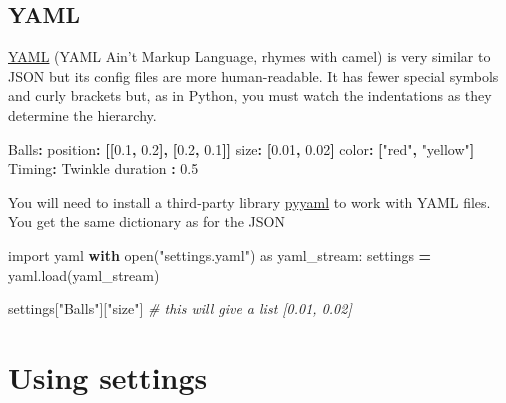\documentclass[
]{book}
\newenvironment{Shaded}{\begin{snugshade}}{\end{snugshade}}
\newcommand{\AttributeTok}[1]{\textcolor[rgb]{0.77,0.63,0.00}{#1}}
\newcommand{\BuiltInTok}[1]{#1}
\newcommand{\CommentTok}[1]{\textcolor[rgb]{0.56,0.35,0.01}{\textit{#1}}}
\newcommand{\ControlFlowTok}[1]{\textcolor[rgb]{0.13,0.29,0.53}{\textbf{#1}}}
\newcommand{\FloatTok}[1]{\textcolor[rgb]{0.00,0.00,0.81}{#1}}
\newcommand{\FunctionTok}[1]{\textcolor[rgb]{0.00,0.00,0.00}{#1}}
\newcommand{\ImportTok}[1]{#1}
\newcommand{\KeywordTok}[1]{\textcolor[rgb]{0.13,0.29,0.53}{\textbf{#1}}}
\newcommand{\NormalTok}[1]{#1}
\newcommand{\OperatorTok}[1]{\textcolor[rgb]{0.81,0.36,0.00}{\textbf{#1}}}
\newcommand{\StringTok}[1]{\textcolor[rgb]{0.31,0.60,0.02}{#1}}
\begin{document}
\hypertarget{yaml}{%
\subsection{YAML}\label{yaml}}

\href{https://en.wikipedia.org/wiki/YAML}{YAML} (YAML Ain't Markup Language, rhymes with camel) is very similar to JSON but its config files are more human-readable. It has fewer special symbols and curly brackets but, as in Python, you must watch the indentations as they determine the hierarchy.

\begin{Shaded}
\begin{Highlighting}[]
\FunctionTok{Balls}\KeywordTok{:}
\AttributeTok{  }\FunctionTok{position}\KeywordTok{:}\AttributeTok{ }\KeywordTok{[[}\FloatTok{0.1}\KeywordTok{,}\AttributeTok{ }\FloatTok{0.2}\KeywordTok{],}\AttributeTok{ }\KeywordTok{[}\FloatTok{0.2}\KeywordTok{,}\AttributeTok{ }\FloatTok{0.1}\KeywordTok{]]}
\AttributeTok{  }\FunctionTok{size}\KeywordTok{:}\AttributeTok{ }\KeywordTok{[}\FloatTok{0.01}\KeywordTok{,}\AttributeTok{ }\FloatTok{0.02}\KeywordTok{]}
\AttributeTok{  }\FunctionTok{color}\KeywordTok{:}\AttributeTok{ }\KeywordTok{[}\StringTok{"red"}\KeywordTok{,}\AttributeTok{ }\StringTok{"yellow"}\KeywordTok{]}
\FunctionTok{Timing}\KeywordTok{:}
\AttributeTok{  }\FunctionTok{Twinkle duration }\KeywordTok{:}\AttributeTok{ }\FloatTok{0.5}
\end{Highlighting}
\end{Shaded}

You will need to install a third-party library \href{https://pyyaml.org/}{pyyaml} to work with YAML files. You get the same dictionary as for the JSON

\begin{Shaded}
\begin{Highlighting}[]
\ImportTok{import}\NormalTok{ yaml}
\ControlFlowTok{with} \BuiltInTok{open}\NormalTok{(}\StringTok{"settings.yaml"}\NormalTok{) }\ImportTok{as}\NormalTok{ yaml\_stream:}
\NormalTok{    settings }\OperatorTok{=}\NormalTok{ yaml.load(yaml\_stream)}
    
\NormalTok{settings[}\StringTok{"Balls"}\NormalTok{][}\StringTok{"size"}\NormalTok{] }\CommentTok{\# this will give a list [0.01, 0.02]}
\end{Highlighting}
\end{Shaded}

\hypertarget{using-settings}{%
\section{Using settings}\label{using-settings}}
\end{document}
